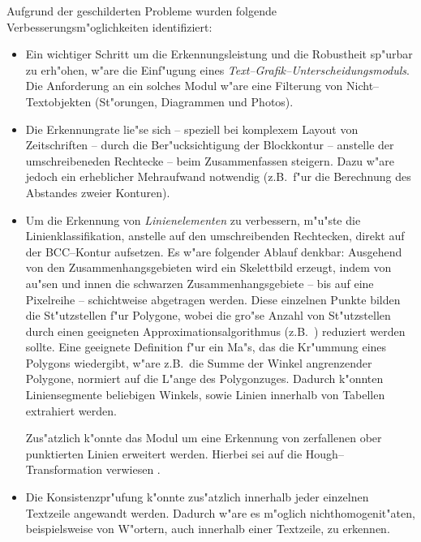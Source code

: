 Aufgrund der geschilderten Probleme wurden folgende Verbesserungsm"oglichkeiten identifiziert:
\begin{itemize}
\item
Ein wichtiger Schritt um die Erkennungsleistung und die Robustheit sp"urbar zu erh"ohen, w"are
die Einf"ugung eines {\em Text--Grafik--Unterscheidungsmoduls\/}. Die Anforderung an ein solches
Modul w"are eine Filterung von Nicht--Textobjekten (St"orungen, Diagrammen und Photos).

\item Die Erkennungrate lie"se sich -- speziell bei komplexem Layout von Zeitschriften -- durch die
Ber"ucksichtigung der Blockkontur -- anstelle der umschreibeneden Rechtecke -- beim Zusammenfassen
steigern. Dazu w"are jedoch ein erheblicher Mehraufwand notwendig (z.B.\ f"ur die Berechnung
des Abstandes zweier Konturen).

\item
Um die Erkennung von {\em Linienelementen\/} zu verbessern, m"u"ste die Linienklassifikation, 
anstelle auf den umschreibenden Rechtecken, direkt auf der BCC--Kontur aufsetzen.
Es w"are folgender Ablauf denkbar:
Ausgehend von den Zusammenhangsgebieten wird ein Skelettbild erzeugt, indem von
au"sen und innen die schwarzen Zusammenhangsgebiete -- bis auf eine Pixelreihe --
schichtweise abgetragen werden. Diese einzelnen Punkte
bilden die St"utzstellen f"ur Polygone, wobei die gro"se Anzahl von St"utzstellen
durch einen geeigneten Approximationsalgorithmus (z.B.\ \cite{Wall83})
reduziert werden sollte. Eine geeignete Definition f"ur ein Ma"s, das die Kr"ummung
eines Polygons wiedergibt, w"are z.B.\ die Summe der Winkel angrenzender Polygone, normiert
auf die L"ange des Polygonzuges. Dadurch k"onnten Liniensegmente beliebigen Winkels, sowie
Linien innerhalb von Tabellen extrahiert werden.

Zus"atzlich k"onnte das Modul um eine Erkennung von zerfallenen ober punktierten Linien 
erweitert werden. Hierbei sei auf die Hough--Transformation verwiesen \cite{Illingworth88}.

\item
Die Konsistenzpr"ufung k"onnte zus"atzlich innerhalb jeder einzelnen Textzeile angewandt werden.
Dadurch w"are es m"oglich nichthomogenit"aten, beispielsweise von W"ortern, auch innerhalb einer
Textzeile, zu erkennen.



\end{itemize}

